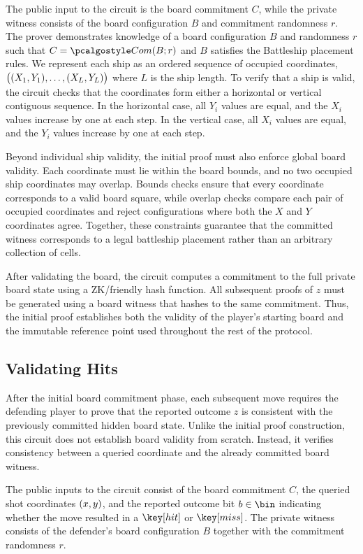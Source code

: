 The public input to the circuit is the board commitment $C$, while the private witness consists of the board configuration $B$ and commitment randomness $r$. The prover demonstrates knowledge of a board configuration $B$ and randomness $r$ such that $C = \commit\del{B; r}$ and $B$ satisfies the Battleship placement rules. We represent each ship as an ordered sequence of occupied coordinates, $\del{\del{X_1, Y_1}, \ldots, \del{X_L, Y_L}}$ where $L$ is the ship length. To verify that a ship is valid, the circuit checks that the coordinates form either a horizontal or vertical contiguous sequence. In the horizontal case, all $Y_i$ values are equal, and the $X_i$ values increase by one at each step. In the vertical case, all $X_i$ values are equal, and the $Y_i$ values increase by one at each step.

Beyond individual ship validity, the initial proof must also enforce global board validity. Each coordinate must lie within the board bounds, and no two occupied ship coordinates may overlap. Bounds checks ensure that every coordinate corresponds to a valid board square, while overlap checks compare each pair of occupied coordinates and reject configurations where both the $X$ and $Y$ coordinates agree. Together, these constraints guarantee that the committed witness corresponds to a legal battleship placement rather than an arbitrary collection of cells.

After validating the board, the circuit computes a commitment to the full private board state using a \gls{ZK}\-/friendly hash function. All subsequent proofs of $z$ must be generated using a board witness that hashes to the same commitment. Thus, the initial proof establishes both the validity of the player's starting board and the immutable reference point used throughout the rest of the protocol.

\subsection{Validating Hits}
\label{subsec:validatingHits}

After the initial board commitment phase, each subsequent move requires the defending player to prove that the reported outcome $z$ is consistent with the previously committed hidden board state. Unlike the initial proof construction, this circuit does not establish board validity from scratch. Instead, it verifies consistency between a queried coordinate and the already committed board witness.

The public inputs to the circuit consist of the board commitment $C$, the queried shot coordinates $\left(x, y\right)$, and the reported outcome bit $b \in \bin$ indicating whether the move resulted in a $\hit$ or $\miss$. The private witness consists of the defender's board configuration $B$ together with the commitment randomness $r$.

